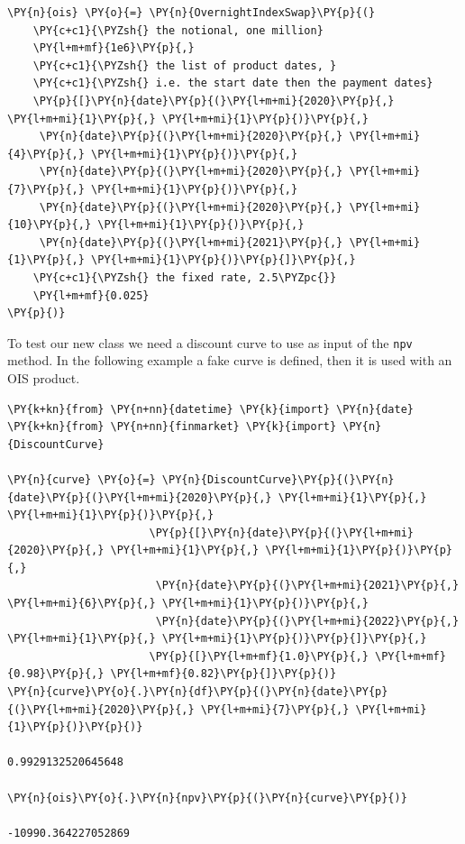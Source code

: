 \begin{tcolorbox}[breakable, size=fbox, boxrule=1pt, pad at break*=1mm,colback=cellbackground, colframe=cellborder]
\begin{Verbatim}[commandchars=\\\{\}]
\PY{n}{ois} \PY{o}{=} \PY{n}{OvernightIndexSwap}\PY{p}{(}
    \PY{c+c1}{\PYZsh{} the notional, one million}
    \PY{l+m+mf}{1e6}\PY{p}{,}
    \PY{c+c1}{\PYZsh{} the list of product dates, }
    \PY{c+c1}{\PYZsh{} i.e. the start date then the payment dates}
    \PY{p}{[}\PY{n}{date}\PY{p}{(}\PY{l+m+mi}{2020}\PY{p}{,} \PY{l+m+mi}{1}\PY{p}{,} \PY{l+m+mi}{1}\PY{p}{)}\PY{p}{,} 
     \PY{n}{date}\PY{p}{(}\PY{l+m+mi}{2020}\PY{p}{,} \PY{l+m+mi}{4}\PY{p}{,} \PY{l+m+mi}{1}\PY{p}{)}\PY{p}{,} 
     \PY{n}{date}\PY{p}{(}\PY{l+m+mi}{2020}\PY{p}{,} \PY{l+m+mi}{7}\PY{p}{,} \PY{l+m+mi}{1}\PY{p}{)}\PY{p}{,} 
     \PY{n}{date}\PY{p}{(}\PY{l+m+mi}{2020}\PY{p}{,} \PY{l+m+mi}{10}\PY{p}{,} \PY{l+m+mi}{1}\PY{p}{)}\PY{p}{,}
     \PY{n}{date}\PY{p}{(}\PY{l+m+mi}{2021}\PY{p}{,} \PY{l+m+mi}{1}\PY{p}{,} \PY{l+m+mi}{1}\PY{p}{)}\PY{p}{]}\PY{p}{,}
    \PY{c+c1}{\PYZsh{} the fixed rate, 2.5\PYZpc{}}
    \PY{l+m+mf}{0.025}
\PY{p}{)}
\end{Verbatim}
\end{tcolorbox}

To test our new class we need a discount curve to use as input of the \texttt{npv} method. 
In the following example a fake curve is defined, then it is used with an OIS product.

\begin{tcolorbox}[breakable, size=fbox, boxrule=1pt, pad at break*=1mm,colback=cellbackground, colframe=cellborder]
\begin{Verbatim}[commandchars=\\\{\}]
\PY{k+kn}{from} \PY{n+nn}{datetime} \PY{k}{import} \PY{n}{date}
\PY{k+kn}{from} \PY{n+nn}{finmarket} \PY{k}{import} \PY{n}{DiscountCurve}
        
\PY{n}{curve} \PY{o}{=} \PY{n}{DiscountCurve}\PY{p}{(}\PY{n}{date}\PY{p}{(}\PY{l+m+mi}{2020}\PY{p}{,} \PY{l+m+mi}{1}\PY{p}{,} \PY{l+m+mi}{1}\PY{p}{)}\PY{p}{,}
                      \PY{p}{[}\PY{n}{date}\PY{p}{(}\PY{l+m+mi}{2020}\PY{p}{,} \PY{l+m+mi}{1}\PY{p}{,} \PY{l+m+mi}{1}\PY{p}{)}\PY{p}{,} 
                       \PY{n}{date}\PY{p}{(}\PY{l+m+mi}{2021}\PY{p}{,} \PY{l+m+mi}{6}\PY{p}{,} \PY{l+m+mi}{1}\PY{p}{)}\PY{p}{,} 
                       \PY{n}{date}\PY{p}{(}\PY{l+m+mi}{2022}\PY{p}{,} \PY{l+m+mi}{1}\PY{p}{,} \PY{l+m+mi}{1}\PY{p}{)}\PY{p}{]}\PY{p}{,}
                      \PY{p}{[}\PY{l+m+mf}{1.0}\PY{p}{,} \PY{l+m+mf}{0.98}\PY{p}{,} \PY{l+m+mf}{0.82}\PY{p}{]}\PY{p}{)}
\PY{n}{curve}\PY{o}{.}\PY{n}{df}\PY{p}{(}\PY{n}{date}\PY{p}{(}\PY{l+m+mi}{2020}\PY{p}{,} \PY{l+m+mi}{7}\PY{p}{,} \PY{l+m+mi}{1}\PY{p}{)}\PY{p}{)}

0.9929132520645648

\PY{n}{ois}\PY{o}{.}\PY{n}{npv}\PY{p}{(}\PY{n}{curve}\PY{p}{)}

-10990.364227052869
\end{Verbatim}
\end{tcolorbox}

